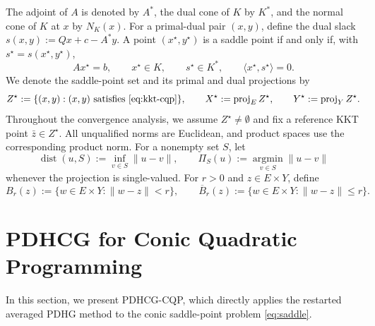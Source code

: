 \documentclass[letterpaper]{article} %
\theoremstyle{definition}
\theoremstyle{remark}
\newcommand{\AVERAGEDPDHG}{}
\begin{document}
The adjoint of $A$ is denoted by
$A^*$, the dual cone of $K$ by $K^*$, and the normal cone of $K$ at $x$ by
$N_K(x)$.  For a primal-dual pair $(x,y)$, define the dual slack $s(x,y):=Qx+c-A^*y.$ 
A point $(x^\star,y^\star)$ is a saddle point if and only if, with
$s^\star=s(x^\star,y^\star)$,
\begin{equation}
\label{eq:kkt-cqp}
    Ax^\star=b,\qquad
    x^\star\in K,\qquad
    s^\star\in K^*,\qquad
    \langle x^\star,s^\star\rangle=0.
\end{equation}
We denote the saddle-point set and its primal and dual projections by
\[
    Z^\star
    :=
    \{(x,y):(x,y)\text{ satisfies \eqref{eq:kkt-cqp}}\},
    \qquad
    X^\star:=\operatorname{proj}_E Z^\star,
    \qquad
    Y^\star:=\operatorname{proj}_Y Z^\star.
\]
Throughout the convergence analysis, we assume $Z^\star\neq\emptyset$ and
fix a reference KKT point $\bar z\in Z^\star$.  All unqualified norms are
Euclidean, and product spaces use the corresponding product norm. 
For a nonempty set $S$, let
\[
    \operatorname{dist}(u,S):=\inf_{v\in S}\|u-v\|,
    \qquad
    \Pi_S(u):=\operatorname*{argmin}_{v\in S}\|u-v\|
\]
whenever the projection is single-valued. For $r>0$ and $z\in E\times Y$, define
\[
    B_r(z)
    :=
    \{w\in E\times Y:\|w-z\|<r\},
    \qquad
    \overline B_r(z)
    :=
    \{w\in E\times Y:\|w-z\|\le r\}.
\]


% 
\ifdefined\AVERAGEDPDHG
\section{PDHCG for Conic Quadratic Programming}
\label{sec:averaged-restart-theory}
\label{sec:rh-restart-theory}

In this section, we present PDHCG-CQP, which directly applies the restarted
averaged PDHG method to the conic saddle-point problem \eqref{eq:saddle}.
\end{document}
